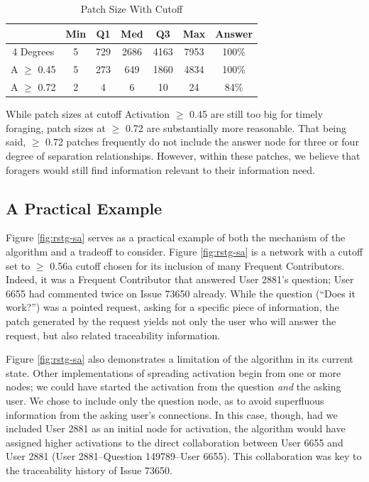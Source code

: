 \documentclass[conference]{IEEEtran}
\begin{document}
\begin{table}[ht]
	\caption{Patch Size With Cutoff}
	\centering
	\begin{tabular}{ |c||c|c|c|c|c||c|  }
		\hline
		& Min & Q1 & Med & Q3 & Max & Answer \\
		\hline
			4 Degrees & 5 & 729 & 2686 & 4163 & 7953 & 100\% \\
			A $\geq$ 0.45 & 5 & 273 & 649 & 1860 & 4834 & 100\% \\
			A $\geq$ 0.72 & 2 & 4 & 6 & 10 & 24 & 84\% \\
		\hline
	\end{tabular}
	\label{tab:resultsStats}
\end{table}

While patch sizes at cutoff Activation $\geq$ 0.45 are still too big for timely foraging, patch sizes at $\geq$ 0.72 are substantially more reasonable. That being said, $\geq$ 0.72 patches frequently do not include the answer node for three or four degree of separation relationships. However, within these patches, we believe that foragers would still find information relevant to their information need.

\subsection{A Practical Example}
Figure \ref{fig:rstg-sa} serves as a practical example of both the mechanism of the algorithm and a tradeoff to consider. Figure \ref{fig:rstg-sa} is a network with a cutoff set to $\geq$ 0.56\textemdash a cutoff chosen for its inclusion of many Frequent Contributors. Indeed, it was a Frequent Contributor that answered User 2881's question; User 6655 had commented twice on Issue 73650 already. While the question (``Does it work?'') was a pointed request, asking for a specific piece of information, the patch generated by the request yields not only the user who will answer the request, but also related traceability information. 

Figure \ref{fig:rstg-sa} also demonstrates a limitation of the algorithm in its current state. Other implementations of spreading activation begin from one or more nodes; we could have started the activation from the question \textit{and} the asking user. We chose to include only the question node, as to avoid superfluous information from the asking user's connections. In this case, though, had we included User 2881 as an initial node for activation, the algorithm would have assigned higher activations to the direct collaboration between User 6655 and User 2881 (User 2881--Question 149789--User 6655). This collaboration was key to the traceability history of Issue 73650.
\end{document}
